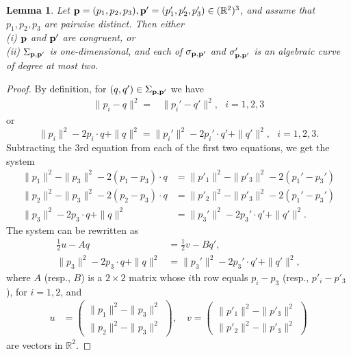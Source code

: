 \documentclass[letterpaper, reqno,11pt]{article}
\newcommand{\RR}{\mathbb{R}}
\newcommand{\p}{{\bf p}}
\newtheorem{lem}[thm]{Lemma}
\theoremstyle{definition}
\theoremstyle{remark}
\begin{document}
\begin{lem}\label{conic}
Let $\p=(p_1,p_2,p_3), \p'=(p_1',p_2',p_3')\in  (\RR^2)^3$, and assume that $p_1,p_2,p_3$ are pairwise distinct.
Then either\\
(i)  $\p$ and $\p'$ are congruent, or \\
(ii) $\Sigma_{\p,\p'}$ is one-dimensional, and each of $\sigma_{\p,\p'}$ and $\sigma'_{\p,\p'}$ is an algebraic curve of degree at most two.
\end{lem}
\begin{proof}
By definition, for $(q,q')\in \Sigma_{\p,\p'}$ we have
\begin{align*}
\|p_i-q\|^2=&\|p_i'-q'\|^2,~~~i=1,2,3
\end{align*}
or
$$
\|p_i\|^2-2p_i\cdot q+\|q\|^2=\|p_i'\|^2-2p_i'\cdot q'+\|q'\|^2,~~~i=1,2,3.
$$
Subtracting  the $3$rd equation from each of the first two equations, we get the system
\begin{align}
\|p_1\|^2-\|p_3\|^2-2(p_1-p_3)\cdot q&= \|p'_1\|^2-\|p'_3\|^2-2(p_1'-p_3')\nonumber\\
\|p_2\|^2-\|p_3\|^2-2(p_2-p_3)\cdot q&= \|p'_2\|^2-\|p'_3\|^2-2(p_1'-p_3')\label{sysK3n}\\
\|p_3\|^2-2p_3\cdot q+\|q\|^2&=\|p_3'\|^2-2p_3'\cdot q'+\|q'\|^2.\nonumber
\end{align}
The system can be rewritten as
\begin{align*}
\tfrac12u-A q&=\tfrac12 v-B q', \\
\|p_3\|^2-2p_3\cdot q+\|q\|^2&=\|p_3'\|^2-2p_3'\cdot q'+\|q'\|^2 ,
\end{align*}
where $A$ (resp., $B$) is a $2\times 2$ matrix whose $i$th row equals $p_i-p_3$ 
(resp., $p'_i-p'_3$), for $i=1,2$, and 
\begin{align*}
u & = \left(\begin{matrix}
           \|p_1\|^2-\|p_3\|^2 \\
          \|p_2\|^2-\|p_3\|^2 
         \end{matrix}
         \right) , \quad 
         v   = \left(\begin{matrix}
           \|p'_1\|^2-\|p'_3\|^2 \\
          \|p'_2\|^2-\|p'_3\|^2 
         \end{matrix}
         \right) 
\end{align*}
are vectors in $\RR^2$. 


\end{proof}
\end{document}

